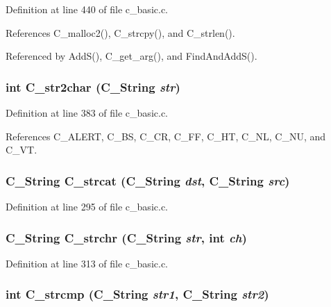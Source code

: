 Definition at line 440 of file c\_\-basic.c.

References C\_\-malloc2(), C\_\-strcpy(), and C\_\-strlen().

Referenced by Add\-S(), C\_\-get\_\-arg(), and Find\-And\-Add\-S().
\subsubsection{\setlength{\rightskip}{0pt plus 5cm}int C\_\-str2char (\bf{C\_\-String} {\em str})}\label{c__basic_8c_4012afc330a3a23981bee97d4fd284f7}




Definition at line 383 of file c\_\-basic.c.

References C\_\-ALERT, C\_\-BS, C\_\-CR, C\_\-FF, C\_\-HT, C\_\-NL, C\_\-NU, and C\_\-VT.
\subsubsection{\setlength{\rightskip}{0pt plus 5cm}\bf{C\_\-String} C\_\-strcat (\bf{C\_\-String} {\em dst}, \bf{C\_\-String} {\em src})}\label{c__basic_8c_57567176a12611bb33df586d84c3b693}




Definition at line 295 of file c\_\-basic.c.
\subsubsection{\setlength{\rightskip}{0pt plus 5cm}\bf{C\_\-String} C\_\-strchr (\bf{C\_\-String} {\em str}, int {\em ch})}\label{c__basic_8c_7fb17d02326bcd719ae51fdb0cb67675}




Definition at line 313 of file c\_\-basic.c.
\subsubsection{\setlength{\rightskip}{0pt plus 5cm}int C\_\-strcmp (\bf{C\_\-String} {\em str1}, \bf{C\_\-String} {\em str2})}\label{c__basic_8c_2388089332b1e34e3b731b322aa8065c}




